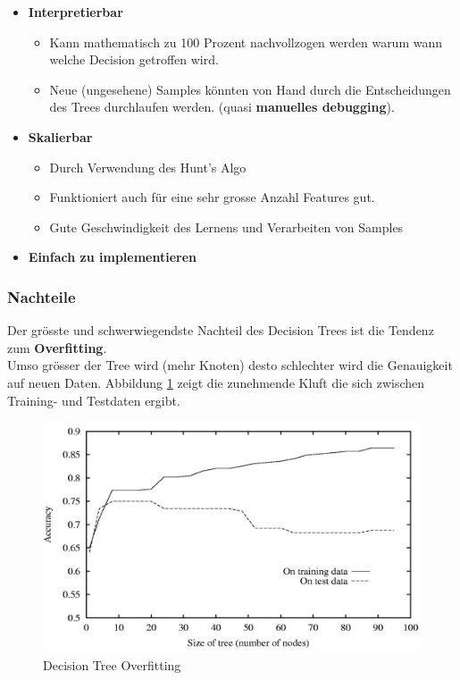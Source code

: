 \begin{itemize}
	\item \textbf{Interpretierbar}
	\begin{itemize}
		\item Kann mathematisch zu 100 Prozent nachvollzogen werden warum wann welche Decision getroffen wird.
		\item Neue (ungesehene) Samples könnten von Hand durch die Entscheidungen des Trees durchlaufen werden. (quasi \textbf{manuelles debugging}).
	\end{itemize}
	\item \textbf{Skalierbar}
	\begin{itemize}
		\item Durch Verwendung des Hunt's Algo
		\item Funktioniert auch für eine sehr grosse Anzahl Features gut.
		\item Gute Geschwindigkeit des Lernens und Verarbeiten von Samples
	\end{itemize}
	\item \textbf{Einfach zu implementieren}
\end{itemize}


\subsubsection{Nachteile}

Der grösste und schwerwiegendste Nachteil des Decision Trees ist die Tendenz zum \textbf{Overfitting}. \\

Umso grösser der Tree wird (mehr Knoten) desto schlechter wird die Genauigkeit auf neuen Daten. Abbildung \ref{fig:dt_overfitting} zeigt die zunehmende Kluft die sich zwischen Training- und Testdaten ergibt.

\begin{figure}[h!]
	\includegraphics[scale=0.6]{figures/decision_tree_overfitting}
	\caption{Decision Tree Overfitting}
	\label{fig:dt_overfitting}
\end{figure}

